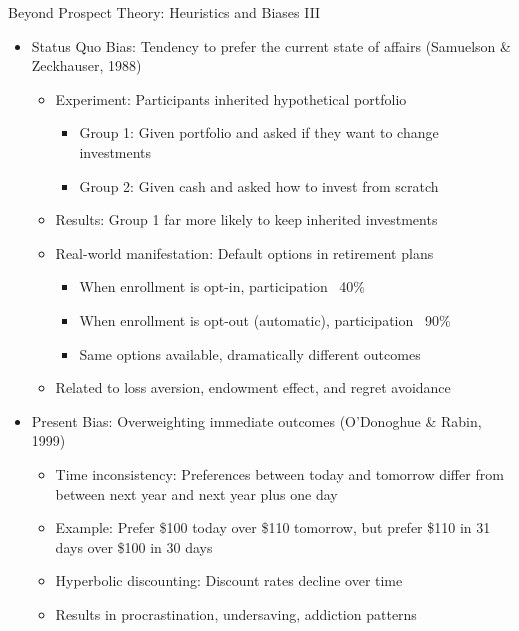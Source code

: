 \documentclass[10pt,handout]{beamer}
\begin{document}
\begin{frame}{Beyond Prospect Theory: Heuristics and Biases III}
  \begin{itemize}[<+->]
    \item Status Quo Bias: Tendency to prefer the current state of affairs (Samuelson \& Zeckhauser, 1988)
      \begin{itemize}
        \item Experiment: Participants inherited hypothetical portfolio
          \begin{itemize}
            \item Group 1: Given portfolio and asked if they want to change investments
            \item Group 2: Given cash and asked how to invest from scratch
          \end{itemize}
        \item Results: Group 1 far more likely to keep inherited investments
        \item Real-world manifestation: Default options in retirement plans
          \begin{itemize}
            \item When enrollment is opt-in, participation ~40\%
            \item When enrollment is opt-out (automatic), participation ~90\%
            \item Same options available, dramatically different outcomes
          \end{itemize}
        \item Related to loss aversion, endowment effect, and regret avoidance
      \end{itemize}
    \item Present Bias: Overweighting immediate outcomes (O'Donoghue \& Rabin, 1999)
      \begin{itemize}
        \item Time inconsistency: Preferences between today and tomorrow differ from between next year and next year plus one day
        \item Example: Prefer \$100 today over \$110 tomorrow, but prefer \$110 in 31 days over \$100 in 30 days
        \item Hyperbolic discounting: Discount rates decline over time
        \item Results in procrastination, undersaving, addiction patterns
      \end{itemize}
  \end{itemize}
\end{frame}
\end{document}
